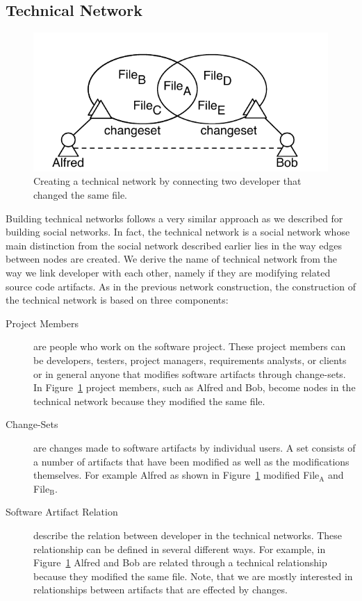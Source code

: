 \subsection{Technical Network}
\begin{figure}[t!]
\centering
\includegraphics[width=.7\textwidth]{figures/cochangedfiles}
\caption{Creating a technical network by connecting two developer that changed the same file.}
\label{fig:addtechnicaledge}
\end{figure}

Building technical networks follows a very similar approach as we described for building social networks.
In fact, the technical network is a social network whose main distinction from the social network described earlier lies in the way edges between nodes are created.
We derive the name of technical network from the way we link developer with each other, namely if they are modifying related source code artifacts.
As in the previous network construction, the construction of the technical network is based on three components:

\begin{description}
\item[Project Members] are people who work on the software project. 
These project members can be developers, testers, project managers, requirements analysts,
or clients or in general anyone that modifies software artifacts through change-sets. 
In Figure~\ref{fig:addtechnicaledge} project members, such as Alfred and Bob, become nodes in the technical network because they modified the same file.

\item[Change-Sets] are changes made to software artifacts by individual users. 
A set consists of a number of artifacts that have been modified as well as the modifications themselves.
For example Alfred as shown in Figure~\ref{fig:addtechnicaledge} modified File$_{\text{A}}$ and File$_{\text{B}}$.

\item[Software Artifact Relation] describe the relation between developer in the technical networks.
These relationship can be defined in several different ways.
For example, in Figure~\ref{fig:addtechnicaledge} Alfred and Bob are related through a technical relationship because they modified the same file.
Note, that we are mostly interested in relationships between artifacts that are effected by changes.
\end{description}

